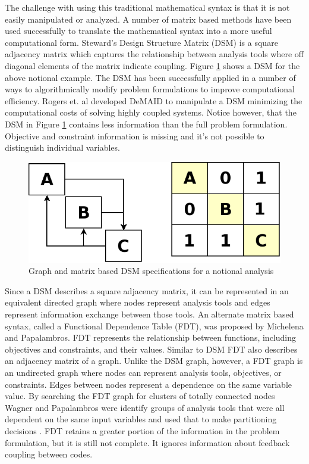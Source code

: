     The challenge with using this traditional mathematical syntax is that it is not easily manipulated or analyzed. 
    A number of matrix based methods have been used successfully to translate the mathematical syntax into a more useful computational form. 
    Steward's Design Structure Matrix (DSM) is a square adjacency matrix which captures the relationship between analysis tools where off 
    diagonal elements of the matrix indicate coupling\cite{Steward1981}. Figure \ref{fig:dsm_simple} shows a DSM for the above notional example. 
    The DSM has been successfully applied in a number of ways to algorithmically modify problem formulations to 
    improve computational efficiency. Rogers et. al developed DeMAID to manipulate a
    DSM  minimizing the computational costs of solving highly coupled systems\cite{Rogers1996}. Notice however, that the DSM in 
    Figure \ref{fig:dsm_simple} contains less information than the full problem formulation. Objective and constraint information 
    is missing and it's not possible to distinguish individual variables.

    \begin{figure}[!hbp]
        \begin{center}
        \includegraphics[width=.75\textwidth]{images/dsm_simple}
        \caption{Graph and matrix based DSM specifications for a notional analysis \label{fig:dsm_simple}}
        \end{center}
    \end{figure}

    Since a DSM describes a square adjacency matrix, it can be represented in an equivalent directed graph where nodes represent analysis tools and 
    edges represent information exchange between those tools. An alternate matrix based syntax, called a 
    Functional Dependence Table (FDT), was proposed by Michelena and Papalambros. 
    FDT represents the relationship between functions, including objectives and constraints, and their values\cite{Michelena1997}. Similar to DSM
    FDT also describes an adjacency matrix of a graph. Unlike the DSM graph, however, a FDT graph is an undirected 
    graph where nodes can represent analysis tools, objectives, or constraints. Edges between nodes represent a dependence on the same 
    variable value. By searching the FDT graph for clusters of totally connected nodes Wagner and Papalambros were identify groups of 
    analysis tools that were all dependent on the same input variables and used that to make partitioning decisions \cite{Wagner1993}. FDT retains 
    a greater portion of the information in the problem formulation, but it is still not complete. It ignores information about feedback coupling 
    between codes. 

